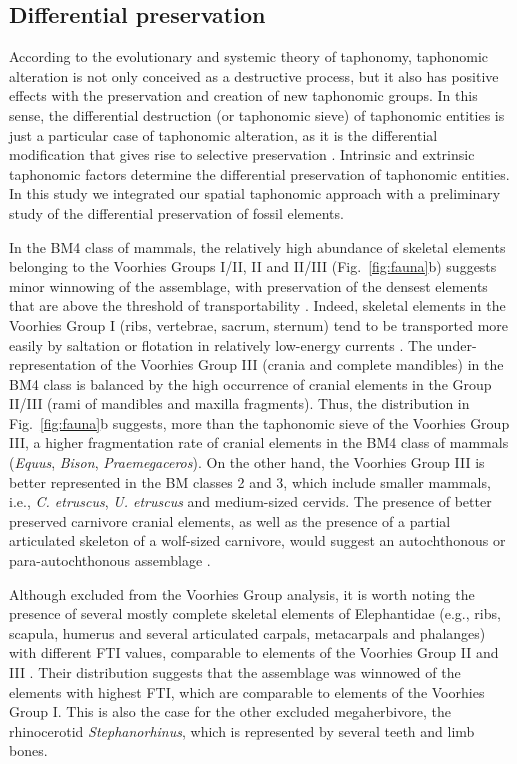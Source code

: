 \documentclass[review,times,authoryear]{elsarticle} %
\begin{document}
\subsection{Differential preservation}

According to the evolutionary and systemic theory of taphonomy, taphonomic alteration is not only conceived as a destructive process, but it also has positive effects with the preservation and creation of new taphonomic groups. In this sense, the differential destruction (or taphonomic sieve) of taphonomic entities is just a particular case of taphonomic alteration, as it is the differential modification that gives rise to selective preservation \citep{Fernandez-Lopez2006}. Intrinsic and extrinsic taphonomic factors determine the differential preservation of taphonomic entities. In this study we integrated our spatial taphonomic approach with a preliminary study of the differential preservation of fossil elements.

In the BM4 class of mammals, the relatively high abundance of skeletal elements belonging to the Voorhies Groups I/II, II and II/III (Fig.~\ref{fig:fauna}b) suggests minor winnowing of the assemblage, with preservation of the densest elements that are above the threshold of transportability \citep{Behrensmeyer1988}. Indeed, skeletal elements in the Voorhies Group I (ribs, vertebrae, sacrum, sternum) tend to be transported more easily by saltation or flotation in relatively low-energy currents \citep{Voorhies1969}. The under-representation of the Voorhies Group III (crania and complete mandibles) in the BM4 class is balanced by the high occurrence of cranial elements in the Group II/III (rami of mandibles and maxilla fragments). Thus, the distribution in Fig.~\ref{fig:fauna}b suggests, more than the taphonomic sieve of the Voorhies Group III, a higher fragmentation rate of cranial elements in the BM4 class of mammals (\emph{Equus}, \emph{Bison}, \emph{Praemegaceros}). On the other hand, the Voorhies Group III is better represented in the BM classes 2 and 3, which include smaller mammals, i.e., \emph{C. etruscus}, \emph{U. etruscus} and medium-sized cervids. The presence of better preserved carnivore cranial elements, as well as the presence of a partial articulated skeleton of a wolf-sized carnivore, would suggest an autochthonous or para-autochthonous assemblage \citep{Behrensmeyer1988}.

Although excluded from the Voorhies Group analysis, it is worth noting the presence of several mostly complete skeletal elements of Elephantidae (e.g., ribs, scapula, humerus and several articulated carpals, metacarpals and phalanges) with different FTI values, comparable to elements of the Voorhies Group II and III \citep{Frison1986}. Their distribution suggests that the assemblage was winnowed of the elements with highest FTI, which are comparable to elements of the Voorhies Group I. This is also the case for the other excluded megaherbivore, the rhinocerotid \emph{Stephanorhinus}, which is represented by several teeth and limb bones.
\end{document}

